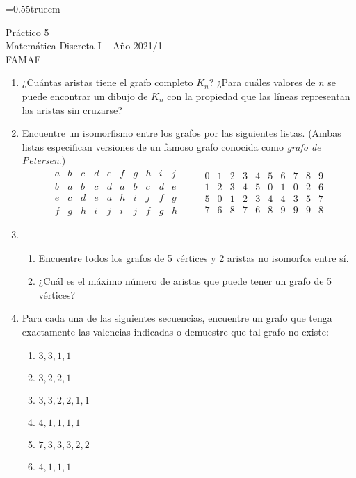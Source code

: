 \documentclass[a4paper,12pt,twoside,spanish,reqno]{amsbook}
\numberwithin{equation}{section}
\begin{document}
    \baselineskip=0.55truecm %
    

{\bf \begin{center}\large  Práctico 5 \\ Matemática Discreta I -- Año 2021/1 \\ FAMAF \end{center}}





\begin{enumerate}
\setlength\itemsep{1.1em}

\item  ¿Cuántas aristas tiene el  grafo completo $K_n$? ¿Para cuáles valores de $n$ se puede encontrar un dibujo de $K_n$ con la propiedad que las líneas representan las aristas sin cruzarse?


\item Encuentre un isomorfismo entre los grafos por las siguientes listas. (Ambas listas especifican versiones de un famoso grafo conocida como {\it grafo de Petersen}.)
$$
\begin{matrix}
a&b&c&d&e&f&g&h&i&j\\ \hline
b&a&b&c&d&a&b&c&d&e\\
e&c&d&e&a&h&i&j&f&g\\
f&g&h&i&j&i&j&f&g&h
\end{matrix}
\qquad \begin{matrix}
0&1&2&3&4&5&6&7&8&9\\ \hline
1&2&3&4&5&0&1&0&2&6\\
5&0&1&2&3&4&4&3&5&7\\
7&6&8&7&6&8&9&9&9&8
\end{matrix}
$$

\item
\begin{enumerate}
\item Encuentre todos los grafos de 5 vértices y 2 aristas no isomorfos entre sí.
 \item ¿Cuál es el máximo número de aristas que puede tener un grafo de 5 vértices?
\end{enumerate}


\item Para cada una de las siguientes secuencias, encuentre un grafo que tenga exactamente las valencias indicadas o demuestre que tal grafo no existe:
\begin{multicols}{3}
\begin{enumerate}
\item $3,3,1,1$
\item $3,2,2,1$
\item $3,3,2,2,1,1$
\item $4,1,1,1,1$
\item $7,3,3,3,2,2$
\item $4,1,1,1$
\end{enumerate}
\end{multicols}



\end{enumerate}
\end{document}
